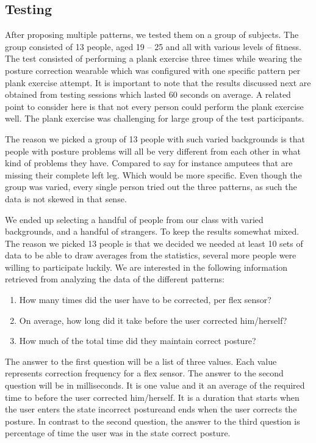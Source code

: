 \documentclass[sigconf]{acmart}
\begin{document}
\subsection{Testing}
After proposing multiple patterns, we tested them on a group of subjects. The group consisted of 13 people, aged 19 – 25 and all with various levels of fitness. The test consisted of performing a plank exercise three times while wearing the posture correction wearable which was configured with one specific pattern per plank exercise attempt. It is important to note that the results discussed next are obtained from testing sessions which lasted 60 seconds on average.
A related point to consider here is that not every person could perform the plank exercise well. The plank exercise was challenging for large group of the test participants. 

The reason we picked a group of 13 people with such varied backgrounds is that people with posture problems will all be very different from each other in what kind of problems they have. Compared to say for instance amputees that are missing their complete left leg. Which would be more specific. Even though the group was varied, every single person tried out the three patterns, as such the data is not skewed in that sense.

We ended up selecting a handful of people from our class with varied backgrounds, and a handful of strangers. To keep the results somewhat mixed. The reason we picked 13 people is that we decided we needed at least 10 sets of data to be able to draw averages from the statistics, several more people were willing to participate luckily.
We are interested in the following information retrieved from analyzing the data of the different patterns:

\begin{enumerate}
\item How many times did the user have to be corrected, per flex sensor?
\item On average, how long did it take before the user corrected him/herself?
\item How much of the total time did they maintain correct posture? 
\end{enumerate}

The answer to the first question will be a list of three values. Each value represents correction frequency for a flex sensor. 
The answer to the second question will be in milliseconds. It is one value and it an average of the required time to before the user corrected him/herself. It is a duration that starts when the user enters the state \textquotesingle incorrect posture\textquotesingle and ends when the user corrects the posture. 
In contrast to the second question, the answer to the third question is percentage of time the user was in the state \textquotesingle correct posture\textquotesingle. 
\end{document}
